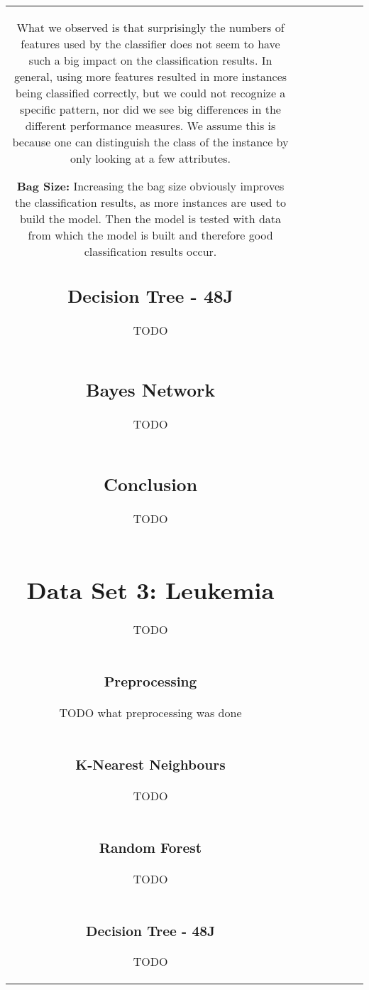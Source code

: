 \documentclass{sig-alternate-05-2015}
\begin{document}
\begin{tabular}{c | c | c | c | c | c | c}
What we observed is that surprisingly the numbers of features used by the classifier does not seem to have such a big impact on the classification results. In general, using more features resulted in more instances being classified correctly, but we could not recognize a specific pattern, nor did we see big differences in the different performance measures. We assume this is because one can distinguish the class of the instance by only looking at a few attributes.

\textbf{Bag Size:}
Increasing the bag size obviously improves the classification results, as more instances are used to build the model. Then the model is tested with data from which the model is built and therefore good classification results occur.

\subsection{Decision Tree - 48J}
TODO\\
\subsection{Bayes Network}
TODO\\
\subsection{Conclusion}
TODO\\


\section{Data Set 3: Leukemia}
TODO\\
\subsubsection{Preprocessing}
TODO what preprocessing was done\\
\subsubsection{K-Nearest Neighbours}
TODO\\
\subsubsection{Random Forest}
TODO\\
\subsubsection{Decision Tree - 48J}
TODO\\

\end{tabular}
\end{document}
